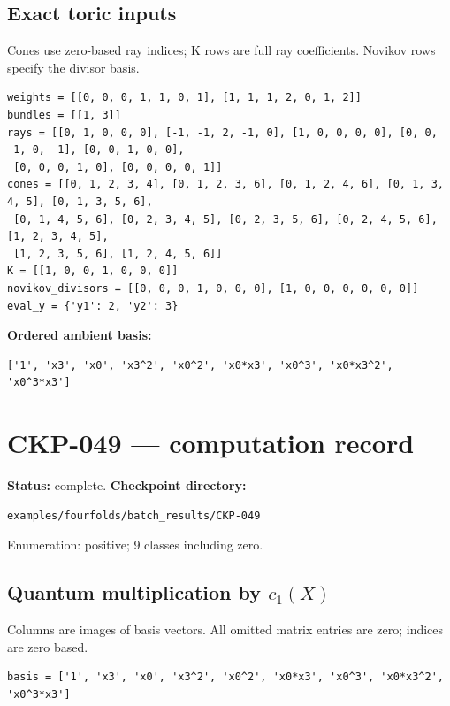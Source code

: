 \documentclass[10pt,a4paper]{article}
\begin{document}
\subsection*{Exact toric inputs}
Cones use zero-based ray indices; K rows are full ray coefficients. Novikov rows specify the divisor basis.

\begin{lstlisting}
weights = [[0, 0, 0, 1, 1, 0, 1], [1, 1, 1, 2, 0, 1, 2]]
bundles = [[1, 3]]
rays = [[0, 1, 0, 0, 0], [-1, -1, 2, -1, 0], [1, 0, 0, 0, 0], [0, 0, -1, 0, -1], [0, 0, 1, 0, 0],
 [0, 0, 0, 1, 0], [0, 0, 0, 0, 1]]
cones = [[0, 1, 2, 3, 4], [0, 1, 2, 3, 6], [0, 1, 2, 4, 6], [0, 1, 3, 4, 5], [0, 1, 3, 5, 6],
 [0, 1, 4, 5, 6], [0, 2, 3, 4, 5], [0, 2, 3, 5, 6], [0, 2, 4, 5, 6], [1, 2, 3, 4, 5],
 [1, 2, 3, 5, 6], [1, 2, 4, 5, 6]]
K = [[1, 0, 0, 1, 0, 0, 0]]
novikov_divisors = [[0, 0, 0, 1, 0, 0, 0], [1, 0, 0, 0, 0, 0, 0]]
eval_y = {'y1': 2, 'y2': 3}
\end{lstlisting}

\textbf{Ordered ambient basis:}
\begin{lstlisting}
['1', 'x3', 'x0', 'x3^2', 'x0^2', 'x0*x3', 'x0^3', 'x0*x3^2', 'x0^3*x3']
\end{lstlisting}

\clearpage\section*{CKP-049 --- computation record}
\textbf{Status:} complete.
\textbf{Checkpoint directory:}
\begin{lstlisting}
examples/fourfolds/batch_results/CKP-049
\end{lstlisting}

Enumeration: positive; 9 classes including zero.
\subsection*{Quantum multiplication by $c_1(X)$}
Columns are images of basis vectors. All omitted matrix entries are zero; indices are zero based.

\begin{lstlisting}
basis = ['1', 'x3', 'x0', 'x3^2', 'x0^2', 'x0*x3', 'x0^3', 'x0*x3^2', 'x0^3*x3']
\end{lstlisting}
\end{document}
